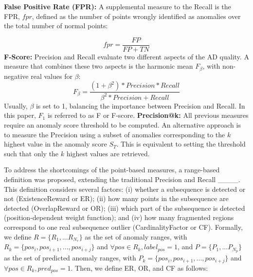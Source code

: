 \noindent \textbf{False Positive Rate (FPR): } A supplemental measure to the Recall is the FPR, $fpr$, defined as the number of points wrongly identified as anomalies over the total number of normal points:

\begin{equation}
fpr = \frac{FP}{FP+TN}
\end{equation}
\newline \textbf{F-Score: } Precision and Recall evaluate two different aspects of the AD quality. A measure that combines these two aspects is the harmonic mean $F_{\beta}$, with non-negative real values for $\beta$:
\begin{equation}
F_{\beta} = \frac{(1+\beta^2)*Precision*Recall}{\beta^2*Precision+Recall}
\end{equation}
\noindent Usually, $\beta$ is set to 1, balancing the importance between Precision and Recall. In this paper, $F_1$ is referred to as F or F-score.
\newline \textbf{Precision@k: } All previous measures require an anomaly score threshold to be computed. An alternative approach is to measure the Precision using a subset of anomalies corresponding to the $k$ highest value in the anomaly score $S_T$. This is equivalent to setting the threshold such that only the $k$ highest values are retrieved. 

To address the shortcomings of the point-based measures, a range-based definition was proposed, extending the traditional Precision and Recall ____. This definition considers several factors: (i) whether a subsequence is detected or not (ExistenceReward or ER); (ii) how many points in the subsequence are detected (OverlapReward or OR); (iii) which part of the subsequence is detected (position-dependent weight function); and (iv) how many fragmented regions correspond to one real subsequence outlier (CardinalityFactor or CF). Formally, we define $R=\{R_1,...R_{N_r}\}$ as the set of anomaly ranges, with $R_k=\{pos_i,pos_{i+1}, ..., pos_{i+j}\}$ and $\forall pos \in R_k, label_{pos} = 1$, and $P=\{P_1,...P_{N_p}\}$ as the set of predicted anomaly ranges, with $P_k=\{pos_i,pos_{i+1}, ..., pos_{i+j}\}$ and $\forall pos \in R_k, pred_{pos} = 1$. Then, we define ER, OR, and CF as follows:

